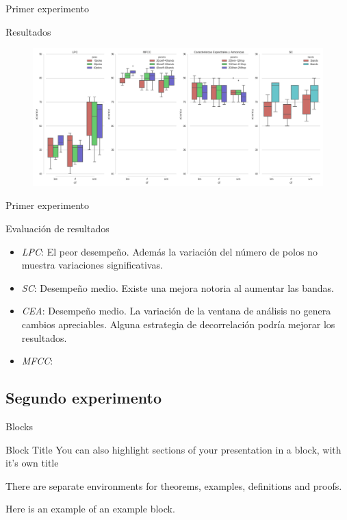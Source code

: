 \documentclass[aspectratio=169]{beamer}
\begin{document}
\begin{frame}{Primer experimento}
\begin{block}{Resultados}
\begin{figure}[H]
\begin{center}
\includegraphics[width=1\textwidth]{exp1_comparacion} 
\end{center}
\end{figure}
\end{block}

\end{frame}

\begin{frame}{Primer experimento}
\begin{block}{Evaluación de resultados}
\begin{itemize}
\item \textit{LPC}: El peor desempeño. Además la variación del número de polos no muestra variaciones significativas.
\item \textit{SC}: Desempeño medio. Existe una mejora notoria al aumentar las bandas.
\item \textit{CEA}: Desempeño medio. La variación de la ventana de análisis no genera cambios apreciables. Alguna estrategia de decorrelación podría mejorar los resultados.
\item \textit{MFCC}: 
\end{itemize}
\end{block}

\end{frame}

\subsection{Segundo experimento}

\begin{frame}{Blocks}
\begin{block}{Block Title}
You can also highlight sections of your presentation in a block, with it's own title
\end{block}
\begin{theorem}
There are separate environments for theorems, examples, definitions and proofs.
\end{theorem}
\begin{example}
Here is an example of an example block.
\end{example}
\end{frame}
\end{document}
